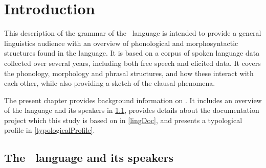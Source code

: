 


\chapter{Introduction}\label{introChapter}%

This description of the grammar of the \PS\ language is intended to provide a general linguistics audience with an overview of phonological and morphosyntactic structures found in the language. It is based on a corpus of spoken language data collected over several years, including both free speech and elicited data. It covers the phonology, morphology and phrasal structures, and how these interact with each other, while also providing a sketch of the clausal phenomena. 

The present chapter provides background information on \PS. It includes an overview of the language and its speakers in \SEC\ref{PSbackground}, provides details about the documentation project which this study is based on in \SEC\ref{lingDoc}, and presents a typological profile in \SEC\ref{typologicalProfile}. 


\section{The \PS\ language and its speakers}\label{PSbackground}

